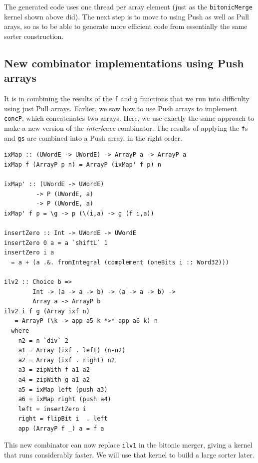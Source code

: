 \documentclass[]{sigplanconf}
\begin{document}
The generated code
uses
one thread per array element (just as the {\tt bitonicMerge}
kernel shown above did). The next step is to move to using Push as
well as Pull arays, so as to be able to generate more efficient code
from essentially the same sorter construction.

\subsection{New combinator implementations using Push arrays}


It is in combining the results of the {\tt f} and {\tt g} functions
that we run into difficulty using just Pull arrays.
Earlier, we saw how to use Push arrays to implement {\tt concP},
which concatenates two arrays.
Here, we use exactly the same approach to make a new version of
the {\em interleave} combinator. The results of applying
the {\tt f}s and {\tt gs} are combined into a Push array, in the right
order.
\pagebreak
\begin{codesize}
\begin{verbatim}
ixMap :: (UWordE -> UWordE) -> ArrayP a -> ArrayP a 
ixMap f (ArrayP p n) = ArrayP (ixMap' f p) n

ixMap' :: (UWordE -> UWordE) 
         -> P (UWordE, a)
         -> P (UWordE, a) 
ixMap' f p = \g -> p (\(i,a) -> g (f i,a))

insertZero :: Int -> UWordE -> UWordE
insertZero 0 a = a `shiftL` 1
insertZero i a 
  = a + (a .&. fromIntegral (complement (oneBits i :: Word32)))

ilv2 :: Choice b => 
        Int -> (a -> a -> b) -> (a -> a -> b) -> 
        Array a -> ArrayP b
ilv2 i f g (Array ixf n) 
   = ArrayP (\k -> app a5 k *>* app a6 k) n
  where
    n2 = n `div` 2
    a1 = Array (ixf . left) (n-n2)
    a2 = Array (ixf . right) n2
    a3 = zipWith f a1 a2
    a4 = zipWith g a1 a2
    a5 = ixMap left (push a3)
    a6 = ixMap right (push a4)
    left = insertZero i
    right = flipBit i  . left
    app (ArrayP f _) a = f a
\end{verbatim}
\end{codesize}
\noindent
This new combinator can now replace {\tt ilv1} in the bitonic
merger, giving a kernel that runs considerably faster. We will use
that kernel to build a large sorter later.
\end{document}
